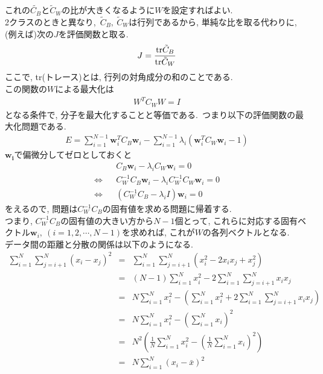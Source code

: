 これの$\tilde{C_{B}}$と$\tilde{C}_{W}$の比が大きくなるように$W$を設定すればよい.\\
2クラスのときと異なり,\ $\tilde{C}_{B},\ \tilde{C}_{W}$は行列であるから, 単純な比を取る代わりに, (例えば)次の$J$を評価関数と取る.
\begin{eqnarray*}
    J=\frac{{\rm tr}\tilde{C}_{B}}{{\rm tr}\tilde{C}_{W}}
\end{eqnarray*}
ここで, tr(トレース)とは, 行列の対角成分の和のことである.\\
この関数の$W$による最大化は
\begin{eqnarray*}
    W^{T}C_{W}W=I
\end{eqnarray*}
となる条件で, 分子を最大化することと等価である.\ つまり以下の評価関数の最大化問題である.
\begin{eqnarray*}
    E=\sum_{i=1}^{N-1}\bm{w}_{i}^{T}C_{B}\bm{w}_{i}-\sum_{i=1}^{N-1}\lambda_{i}(\bm{w}_{i}^{T}C_{W}\bm{w}_{i}-1)
\end{eqnarray*}
$\bm{w_{i}}$で偏微分してゼロとしておくと
\begin{eqnarray*}
    &&C_{B}\bm{w}_{i}-\lambda_{i}C_{W}\bm{w}_{i}=0\\
    \Longleftrightarrow && C_{W}^{-1}C_{B}\bm{w}_{i}-\lambda_{i}C_{W}^{-1}C_{W}\bm{w}_{i}=0\\
    \Longleftrightarrow && (C_{W}^{-1}C_{B}-\lambda_{i}I)\bm{w}_{i}=0
\end{eqnarray*}
をえるので, 問題は$C_{W}^{-1}C_{B}$の固有値を求める問題に帰着する.\\
つまり, $C_{W}^{-1}C_{B}$の固有値の大きい方から$N-1$個とって, これらに対応する固有ベクトル$\bm{w}_{i},\ (i=1,2,\cdots,N-1)$を求めれば, これが$W$の各列ベクトルとなる.\\
データ間の距離と分散の関係は以下のようになる.
\begin{eqnarray*}
    \sum_{i=1}^{N}\sum_{j=i+1}^{N}(x_{i}-x_{j})^{2}&=& \sum_{i=1}^{N}\sum_{j=i+1}^{N}(x_{i}^{2}-2x_{i}x_{j}+x_{j}^{2})\\
                                                   &=& (N-1)\sum_{i=1}^{N}x_{i}^{2}-2\sum_{i=1}^{N}\sum_{j=i+1}^{N}x_{i}x_{j}\\
                                                   &=& N\sum_{i=1}^{N}x_{i}^{2}-\left(\sum_{i=1}^{N}x_{i}^{2}+2\sum_{i=1}^{N}\sum_{j=i+1}^{N}x_{i}x_{j}\right)\\
                                                   &=& N\sum_{i=1}^{N}x_{i}^{2}-\left(\sum_{i=1}^{N}x_{i}\right)^{2}\\
                                                   &=& N^{2}\left(\frac{1}{N}\sum_{i=1}^{N}x_{i}^{2}-\left(\frac{1}{N}\sum_{i=1}^{N}x_{i}\right)^{2}\right)\\
                                                   &=& N\sum_{i=1}^{N}(x_{i}-\bar{x})^{2}
\end{eqnarray*}
